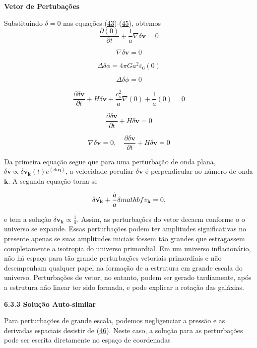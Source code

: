 \documentclass[a4paper,12pt]{article}
\begin{document}
\begin{center}
	\textbf{Vetor de Pertubações}
\end{center}
Substituindo $\delta =0 $ nas equações (\hyperref[eq43]{43})-(\hyperref[eq45]{45}), obtemos
$$\dfrac{\partial (0)}{\partial t} + \dfrac{1}{a}\nabla\delta\mathbf{v} = 0$$

$$\nabla\delta\mathbf{v} = 0$$
\newline

$$\Delta\delta\phi = 4\pi Ga^2\varepsilon_0 (0)$$

$$\Delta\delta\phi = 0$$
\newline

$$\dfrac{\partial\delta\mathbf{v}}{\partial t} + H\delta\mathbf{v} + \dfrac{c^2_s}{a}\nabla(0) +\dfrac{1}{a}(0) = 0$$

$$\dfrac{\partial\delta\mathbf{v}}{\partial t} + H\delta\mathbf{v} = 0$$
\newline

\begin{equation}\label{eq57}
	\nabla\delta\mathbf{v} = 0 , \quad \dfrac{\partial\delta\mathbf{v}}{\partial t } + H\delta\mathbf{v} = 0
\end{equation}

Da primeira equação segue que para uma perturbação de onda plana, $\delta\mathbf{v} \propto \delta\mathbf{v}_\mathbf{k} (t)e^{(i\mathbf{kq})}$, a velocidade peculiar $\delta\mathbf{v}$ é perpendicular ao número de onda $\mathbf{k}$. A segunda equação torna-se

\begin{equation}\label{eq58}
	\delta\dot{\mathbf{v}_\mathbf{k}} + \dfrac{\dot{a}}{a}\delta\\mathbf{v}_\mathbf{k}=0,
\end{equation}

e tem a solução $\delta\mathbf{v_k} \propto \frac{1}{a}$. Assim, as perturbações do vetor decaem conforme o
o universo se expande. Essas perturbações podem ter amplitudes significativas no presente
apenas se suas amplitudes iniciais fossem tão grandes que estragassem completamente a isotropia do universo primordial. Em um universo inflacionário, não há espaço para tão grande
perturbações vetoriais primordiais e não desempenham qualquer papel na formação de
a estrutura em grande escala do universo. Perturbações de vetor, no entanto, podem ser
gerado tardiamente, após a estrutura não linear ter sido formada, e pode explicar
a rotação das galáxias.

\begin{center}
	\textbf{6.3.3 Solução Auto-similar}
\end{center}
Para perturbações de grande escala, podemos negligenciar a pressão e as derivadas espaciais
desistir de (\hyperref[eq46]{46}). Neste caso, a solução para as perturbações pode ser escrita diretamente
no espaço de coordenadas
\end{document}
